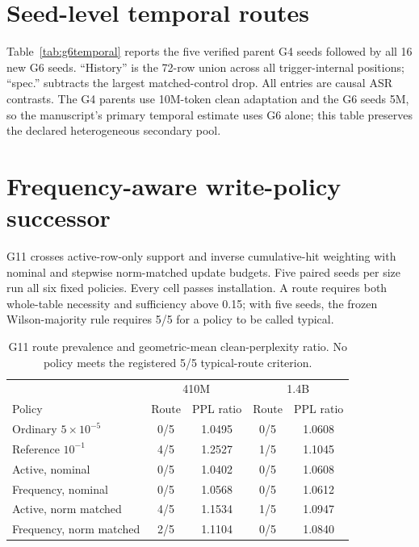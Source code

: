 \documentclass{article}
\begin{document}
\section{Seed-level temporal routes}

Table~\ref{tab:g6temporal} reports the five verified parent G4 seeds followed
by all 16 new G6 seeds. ``History'' is the 72-row union across all
trigger-internal positions; ``spec.'' subtracts the largest matched-control
drop. All entries are causal ASR contrasts. The G4 parents use 10M-token clean
adaptation and the G6 seeds 5M, so the manuscript's primary temporal estimate
uses G6 alone; this table preserves the declared heterogeneous secondary pool.
\begin{table}[h]
\centering\scriptsize
\renewcommand{\arraystretch}{0.88}

\caption{Every seed in the pooled temporal-footprint analysis.}
\label{tab:g6temporal}
\end{table}
\FloatBarrier

\section{Frequency-aware write-policy successor}
\label{app:g11}

G11 crosses active-row-only support and inverse cumulative-hit weighting with
nominal and stepwise norm-matched update budgets. Five paired seeds per size run
all six fixed policies. Every cell passes installation. A route requires both
whole-table necessity and sufficiency above 0.15; with five seeds, the frozen
Wilson-majority rule requires 5/5 for a policy to be called typical.

\begin{table}[h]
\centering\scriptsize
\setlength{\tabcolsep}{3.5pt}
\begin{tabular}{lcccc}
\toprule
& \multicolumn{2}{c}{410M} & \multicolumn{2}{c}{1.4B} \\
Policy & Route & PPL ratio & Route & PPL ratio \\
\midrule
Ordinary $5\!\times\!10^{-5}$ & 0/5 & 1.0495 & 0/5 & 1.0608 \\
Reference $10^{-1}$ & 4/5 & 1.2527 & 1/5 & 1.1045 \\
Active, nominal & 0/5 & 1.0402 & 0/5 & 1.0608 \\
Frequency, nominal & 0/5 & 1.0568 & 0/5 & 1.0612 \\
Active, norm matched & 4/5 & 1.1534 & 1/5 & 1.0947 \\
Frequency, norm matched & 2/5 & 1.1104 & 0/5 & 1.0840 \\
\bottomrule
\end{tabular}
\caption{G11 route prevalence and geometric-mean clean-perplexity ratio. No
policy meets the registered 5/5 typical-route criterion.}
\label{tab:g11}
\end{table}
\end{document}
